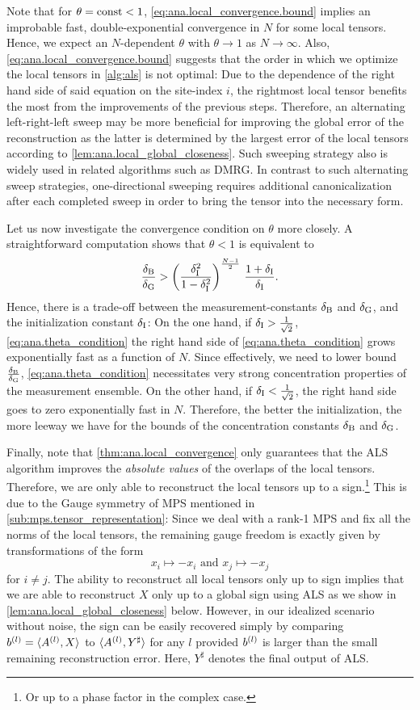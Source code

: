 Note that for $\theta = \mathrm{const} < 1$, \cref{eq:ana.local_convergence.bound} implies an improbable fast, double-exponential convergence in $N$ for some local tensors.
Hence, we expect an $N$-dependent  $\theta$ with $\theta \to 1$ as $N \to \infty$.
Also, \cref{eq:ana.local_convergence.bound} suggests that the order in which we optimize the local tensors in \cref{alg:als} is not optimal:
Due to the dependence of the right hand side of said equation on the site-index $i$, the rightmost local tensor benefits the most from the improvements of the previous steps.
Therefore, an alternating left-right-left sweep may be more beneficial for improving the global error of the reconstruction as the latter is determined by the largest error of the local tensors according to \cref{lem:ana.local_global_closeness}.
Such sweeping strategy also is widely used in related algorithms such as DMRG.
In contrast to such alternating sweep strategies, one-directional sweeping requires additional canonicalization after each completed sweep in order
to bring the tensor into the necessary form.

Let us now investigate the convergence condition on $\theta$ more closely.
A straightforward computation shows that $\theta < 1$ is equivalent to
\[
  \label{eq:ana.theta_condition}
  \frac{\delta_\mathrm{B}}{\delta_\mathrm{G}} > \left( \frac{\delta_\mathrm{I}^2}{1 - \delta_\mathrm{I}^2} \right)^{\frac{N - 1}{2}} \, \frac{1 + \delta_\mathrm{I}}{\delta_\mathrm{I}}.
\]
Hence, there is a trade-off between the measurement-constants $\delta_\mathrm{B}$ and $\delta_\mathrm{G}$, and the initialization constant $\delta_\mathrm{I}$:
On the one hand, if $\delta_\mathrm{I} > \frac{1}{\sqrt{2}}$, \cref{eq:ana.theta_condition} the right hand side of \cref{eq:ana.theta_condition} grows exponentially fast as a function of $N$.
Since effectively, we need to lower bound $\frac{\delta_\mathrm{B}}{\delta_\mathrm{G}}$, \cref{eq:ana.theta_condition} necessitates very strong concentration properties of the measurement ensemble.
On the other hand, if $\delta_\mathrm{I} < \frac{1}{\sqrt{2}}$, the right hand side goes to zero exponentially fast in $N$.
Therefore, the better the initialization, the more leeway we have for the bounds of the concentration constants $\delta_\mathrm{B}$ and $\delta_\mathrm{G}$.

Finally, note that \cref{thm:ana.local_convergence} only guarantees that the ALS algorithm improves the \emph{absolute values} of the overlaps of the local tensors.
Therefore, we are only able to reconstruct the local tensors up to a sign.\footnote{%
  Or up to a phase factor in the complex case.
}
This is due to the Gauge symmetry of MPS mentioned in \cref{sub:mps.tensor_representation}:
Since we deal with a rank-1 MPS and fix all the norms of the local tensors, the remaining gauge freedom is exactly given by transformations of the form
\[
  x_i \mapsto -x_i \mbox{ and } x_j \mapsto -x_j
\]
for $i \neq j$.
The ability to reconstruct all local tensors only up to sign implies that we are able to reconstruct $X$ only up to a global sign using ALS as we show in \cref{lem:ana.local_global_closeness} below.
However, in our idealized scenario without noise, the sign can be easily recovered simply by comparing $b^{(l)}= \braket{A^{(l)}, X}$ to $\braket{A^{(l)}, Y^\sharp}$ for any $l$ provided $b^{(l)}$ is larger than the small remaining reconstruction error.
Here, $Y^\sharp$ denotes the final output of ALS.




